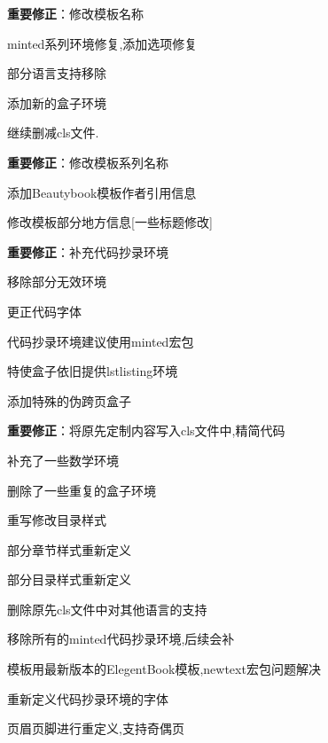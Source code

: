 \begin{change}
    \item \textbf{重要修正}：修改模板名称
    \item minted系列环境修复,添加选项修复
    \item 部分语言支持移除
    \item 添加新的盒子环境
    \item 继续删减cls文件.
\end{change}


\begin{change}
    \item \textbf{重要修正}：修改模板系列名称
    \item 添加Beautybook模板作者引用信息
    \item 修改模板部分地方信息[一些标题修改]
\end{change}


\begin{change}
    \item \textbf{重要修正}：补充代码抄录环境
    \item 移除部分无效环境
    \item 更正代码字体
    \item 代码抄录环境建议使用minted宏包
    \item 特使盒子依旧提供lstlisting环境
    \item 添加特殊的伪跨页盒子
\end{change}


\begin{change}
 \item \textbf{重要修正}：将原先定制内容写入cls文件中,精简代码
\item 补充了一些数学环境
\item 删除了一些重复的盒子环境
\item 重写修改目录样式
\item {}
\item 部分章节样式重新定义
\item 部分目录样式重新定义
\item 删除原先cls文件中对其他语言的支持
\item 移除所有的minted代码抄录环境,后续会补
\item 模板用最新版本的ElegentBook模板,newtext宏包问题解决
\item 重新定义代码抄录环境的字体
\item 页眉页脚进行重定义,支持奇偶页
\end{change}

